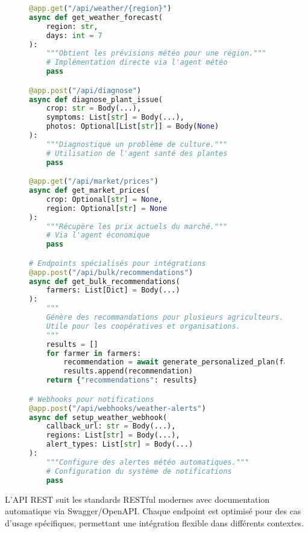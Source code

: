 \begin{figure}[h]
\begin{lstlisting}[language=Python, caption=Points d'entrée de l'API REST]
@app.get("/api/weather/{region}")
async def get_weather_forecast(
    region: str,
    days: int = 7
):
    """Obtient les prévisions météo pour une région."""
    # Implémentation directe via l'agent météo
    pass

@app.post("/api/diagnose")
async def diagnose_plant_issue(
    crop: str = Body(...),
    symptoms: List[str] = Body(...),
    photos: Optional[List[str]] = Body(None)
):
    """Diagnostique un problème de culture."""
    # Utilisation de l'agent santé des plantes
    pass

@app.get("/api/market/prices")
async def get_market_prices(
    crop: Optional[str] = None,
    region: Optional[str] = None
):
    """Récupère les prix actuels du marché."""
    # Via l'agent économique
    pass

# Endpoints spécialisés pour intégrations
@app.post("/api/bulk/recommendations")
async def get_bulk_recommendations(
    farmers: List[Dict] = Body(...)
):
    """
    Génère des recommandations pour plusieurs agriculteurs.
    Utile pour les coopératives et organisations.
    """
    results = []
    for farmer in farmers:
        recommendation = await generate_personalized_plan(farmer)
        results.append(recommendation)
    return {"recommendations": results}

# Webhooks pour notifications
@app.post("/api/webhooks/weather-alerts")
async def setup_weather_webhook(
    callback_url: str = Body(...),
    regions: List[str] = Body(...),
    alert_types: List[str] = Body(...)
):
    """Configure des alertes météo automatiques."""
    # Configuration du système de notifications
    pass
\end{lstlisting}
\end{figure}

L'API REST suit les standards RESTful modernes avec documentation automatique via Swagger/OpenAPI. Chaque endpoint est optimisé pour des cas d'usage spécifiques, permettant une intégration flexible dans différents contextes.


